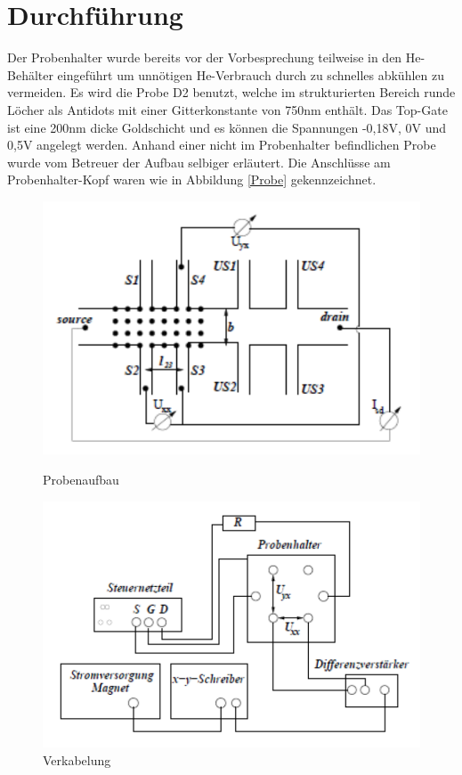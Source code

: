 \documentclass[10pt,a4paper]{article}
\begin{document}
\section{Durchführung}
Der Probenhalter wurde bereits vor der Vorbesprechung teilweise in den He-Behälter eingeführt um unnötigen He-Verbrauch durch zu schnelles abkühlen zu vermeiden. Es wird die Probe D2 benutzt, welche im strukturierten Bereich runde Löcher als Antidots mit einer Gitterkonstante von 750nm enthält. Das Top-Gate ist eine 200nm dicke Goldschicht und es können die Spannungen -0,18V, 0V und 0,5V angelegt werden. Anhand einer nicht im Probenhalter befindlichen Probe wurde vom Betreuer der Aufbau selbiger erläutert. Die Anschlüsse am Probenhalter-Kopf waren wie in Abbildung \ref{Probe} \cite{1} gekennzeichnet. \\
\begin{figure}[H]
\begin{minipage}[b]{5.5 cm}
\includegraphics[scale=0.5]{Probenaufbau_cropped.pdf}
\caption{Probenaufbau}
\label{Probe}
\end{minipage}
\begin{minipage}[b]{5.5 cm}
\includegraphics[scale=0.5]{Verkabelung_cropped.pdf}
\caption{Verkabelung}
\label{Verkabelung}
\end{minipage}
\end{figure}
\end{document}
